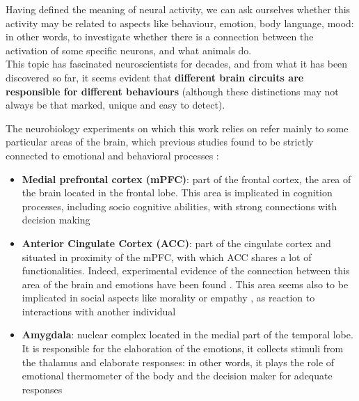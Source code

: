 \documentclass[12pt, a4paper]{report}
\begin{document}
	Having defined the meaning of neural activity, we can ask ourselves whether this activity may be related to aspects like behaviour, emotion, body language, mood: in other words, to investigate whether there is a connection between the activation of some specific neurons, and what animals do.\\
	This topic has fascinated neuroscientists for decades, and from what it has been discovered so far, it seems evident that \textbf{different brain circuits are responsible for different behaviours} (although these distinctions may not always be that marked, unique and easy to detect).

	
	The neurobiology experiments on which this work relies on refer mainly to some particular areas of the brain, which previous studies found to be strictly connected to emotional and behavioral processes \cite{2}: %
	\begin{itemize}
		
		\item \textbf{Medial prefrontal cortex (mPFC)}:  part of the frontal cortex, the area of the brain located in the frontal lobe. This area is implicated in cognition processes, including socio cognitive abilities,  with strong connections with decision making \cite{3} %
		
		\item \textbf{Anterior Cingulate Cortex (ACC)}: part of the cingulate cortex and situated in proximity of the mPFC,  with which  ACC shares a lot of functionalities. Indeed, experimental evidence of the connection between this area of the brain and emotions have been found \cite{4}. %
		 This area seems also to be implicated in social aspects like morality or empathy \cite{5}, %
		  as reaction to interactions with another individual
		
		\item \textbf{Amygdala}: nuclear complex located in the medial part of the temporal lobe. It is responsible for the elaboration of the emotions, it collects stimuli from the thalamus and elaborate responses: in other words, it plays the role of emotional thermometer of the body and the decision maker for adequate responses \cite{6} %
	\end{itemize}
\end{document}
